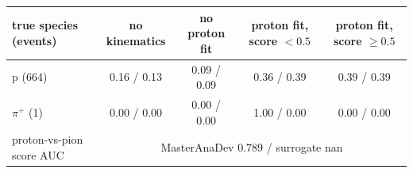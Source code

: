 \begin{tabular}{lcccc}
\toprule
true species (events) & no kinematics & no proton fit & proton fit, score $<0.5$ & proton fit, score $\geq 0.5$ \\
\midrule
p (664) & 0.16 / 0.13 & 0.09 / 0.09 & 0.36 / 0.39 & 0.39 / 0.39 \\
$\pi^+$ (1) & 0.00 / 0.00 & 0.00 / 0.00 & 1.00 / 0.00 & 0.00 / 0.00 \\
\midrule
proton-vs-pion score AUC & \multicolumn{4}{c}{MasterAnaDev 0.789 / surrogate nan} \\
\bottomrule
\end{tabular}
